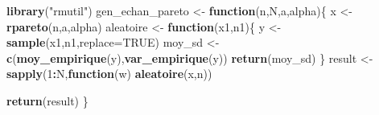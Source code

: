 \documentclass[]{article}
\newenvironment{Shaded}{\begin{snugshade}}{\end{snugshade}}
\newcommand{\ControlFlowTok}[1]{\textcolor[rgb]{0.13,0.29,0.53}{\textbf{#1}}}
\newcommand{\DataTypeTok}[1]{\textcolor[rgb]{0.13,0.29,0.53}{#1}}
\newcommand{\DecValTok}[1]{\textcolor[rgb]{0.00,0.00,0.81}{#1}}
\newcommand{\KeywordTok}[1]{\textcolor[rgb]{0.13,0.29,0.53}{\textbf{#1}}}
\newcommand{\NormalTok}[1]{#1}
\newcommand{\OperatorTok}[1]{\textcolor[rgb]{0.81,0.36,0.00}{\textbf{#1}}}
\newcommand{\OtherTok}[1]{\textcolor[rgb]{0.56,0.35,0.01}{#1}}
\newcommand{\StringTok}[1]{\textcolor[rgb]{0.31,0.60,0.02}{#1}}
\begin{document}
\begin{Shaded}
\begin{Highlighting}[]
\KeywordTok{library}\NormalTok{(}\StringTok{"rmutil"}\NormalTok{)}
\NormalTok{gen_echan_pareto <-}\StringTok{ }\ControlFlowTok{function}\NormalTok{(n,N,a,alpha)\{}
\NormalTok{    x <-}\StringTok{ }\KeywordTok{rpareto}\NormalTok{(n,a,alpha)}
\NormalTok{    aleatoire <-}\StringTok{ }\ControlFlowTok{function}\NormalTok{(x1,n1)\{}
\NormalTok{      y <-}\StringTok{ }\KeywordTok{sample}\NormalTok{(x1,n1,}\DataTypeTok{replace=}\OtherTok{TRUE}\NormalTok{)}
\NormalTok{      moy_sd <-}\StringTok{ }\KeywordTok{c}\NormalTok{(}\KeywordTok{moy_empirique}\NormalTok{(y),}\KeywordTok{var_empirique}\NormalTok{(y))}
     \KeywordTok{return}\NormalTok{(moy_sd)}
\NormalTok{    \}}
\NormalTok{  result <-}\StringTok{ }\KeywordTok{sapply}\NormalTok{(}\DecValTok{1}\OperatorTok{:}\NormalTok{N,}\ControlFlowTok{function}\NormalTok{(w) }\KeywordTok{aleatoire}\NormalTok{(x,n))}
  
  \KeywordTok{return}\NormalTok{(result)}
\NormalTok{\}}


\end{Highlighting}
\end{Shaded}
\end{document}
